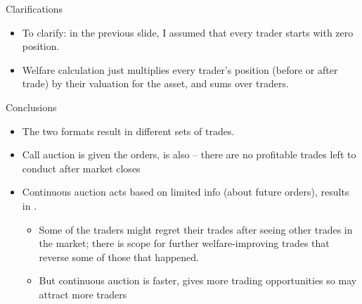 \documentclass[english,10pt
,aspectratio=169
]{beamer}
\begin{document}
\begin{frame}{Clarifications}
	\begin{itemize}
		\item To clarify: in the previous slide, I assumed that every trader starts with zero position.
		\item Welfare calculation just multiplies every trader's position (before or after trade) by their valuation for the asset, and sums over traders.
	\end{itemize}
\end{frame}


\begin{frame}{Conclusions}
	\begin{itemize}
		\item The two formats result in different sets of trades. 
		\item \alert{Call auction} is  given the orders, is also  -- there are no profitable trades left to conduct after market closes
		\item \alert{Continuous auction} acts based on limited info (about future orders), results in .
		\begin{itemize}
			\item Some of the traders might regret their trades after seeing other trades in the market; there is scope for further welfare-improving trades that reverse some of those that happened.
			\item But continuous auction is faster, gives more trading opportunities so may attract more traders
		\end{itemize}
	\end{itemize}
\end{frame}
\end{document}
